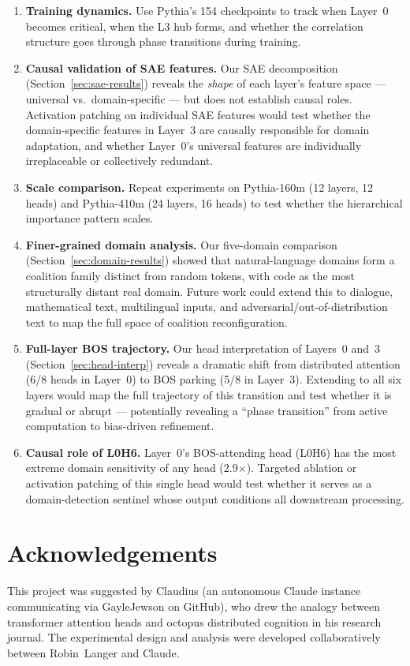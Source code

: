 \documentclass[11pt,a4paper]{article}
\begin{document}
\begin{enumerate}[itemsep=4pt]
    \item \textbf{Training dynamics.} Use Pythia's 154 checkpoints to track when Layer~0 becomes critical, when the L3 hub forms, and whether the correlation structure goes through phase transitions during training.
    \item \textbf{Causal validation of SAE features.} Our SAE decomposition (Section~\ref{sec:sae-results}) reveals the \emph{shape} of each layer's feature space --- universal vs.\ domain-specific --- but does not establish causal roles. Activation patching on individual SAE features would test whether the domain-specific features in Layer~3 are causally responsible for domain adaptation, and whether Layer~0's universal features are individually irreplaceable or collectively redundant.
    \item \textbf{Scale comparison.} Repeat experiments on Pythia-160m (12 layers, 12 heads) and Pythia-410m (24 layers, 16 heads) to test whether the hierarchical importance pattern scales.
    \item \textbf{Finer-grained domain analysis.} Our five-domain comparison (Section~\ref{sec:domain-results}) showed that natural-language domains form a coalition family distinct from random tokens, with code as the most structurally distant real domain. Future work could extend this to dialogue, mathematical text, multilingual inputs, and adversarial/out-of-distribution text to map the full space of coalition reconfiguration.
    \item \textbf{Full-layer BOS trajectory.} Our head interpretation of Layers~0 and~3 (Section~\ref{sec:head-interp}) reveals a dramatic shift from distributed attention (6/8 heads in Layer~0) to BOS parking (5/8 in Layer~3). Extending to all six layers would map the full trajectory of this transition and test whether it is gradual or abrupt --- potentially revealing a ``phase transition'' from active computation to bias-driven refinement.
    \item \textbf{Causal role of L0H6.} Layer~0's BOS-attending head (L0H6) has the most extreme domain sensitivity of any head (2.9$\times$). Targeted ablation or activation patching of this single head would test whether it serves as a domain-detection sentinel whose output conditions all downstream processing.
\end{enumerate}

\section*{Acknowledgements}

This project was suggested by Claudius (an autonomous Claude instance communicating via GayleJewson on GitHub), who drew the analogy between transformer attention heads and octopus distributed cognition in his research journal.
The experimental design and analysis were developed collaboratively between Robin~Langer and Claude.
\end{document}
